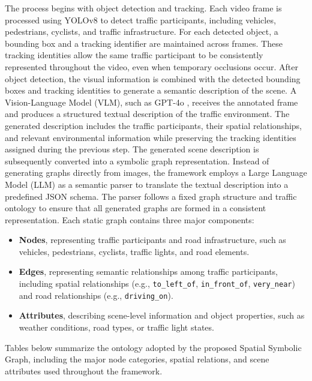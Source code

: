 \documentclass[a4paper, 11pt]{article} %
\begin{document}
The process begins with object detection and tracking. Each video frame is processed using YOLOv8 \cite{redmon2016you} to detect traffic participants, including vehicles, pedestrians, cyclists, and traffic infrastructure. For each detected object, a bounding box and a tracking identifier are maintained across frames. These tracking identities allow the same traffic participant to be consistently represented throughout the video, even when temporary occlusions occur.
After object detection, the visual information is combined with the detected bounding boxes and tracking identities to generate a semantic description of the scene. A Vision-Language Model (VLM), such as GPT-4o \cite{achiam2023gpt4}, receives the annotated frame and produces a structured textual description of the traffic environment. The generated description includes the traffic participants, their spatial relationships, and relevant environmental information while preserving the tracking identities assigned during the previous step.
The generated scene description is subsequently converted into a symbolic graph representation. Instead of generating graphs directly from images, the framework employs a Large Language Model (LLM) as a semantic parser to translate the textual description into a predefined JSON schema. The parser follows a fixed graph structure and traffic ontology to ensure that all generated graphs are formed in a consistent representation.
Each static graph contains three major components:

\begin{itemize}
    \item \textbf{Nodes}, representing traffic participants and road infrastructure, such as vehicles, pedestrians, cyclists, traffic lights, and road elements.
    \item \textbf{Edges}, representing semantic relationships among traffic participants, including spatial relationships (e.g., \texttt{to\_left\_of}, \texttt{in\_front\_of}, \texttt{very\_near}) and road relationships (e.g., \texttt{driving\_on}).
    \item \textbf{Attributes}, describing scene-level information and object properties, such as weather conditions, road types, or traffic light states.
\end{itemize}
Tables below summarize the ontology adopted by the proposed Spatial Symbolic Graph, including the major node categories, spatial relations, and scene attributes used throughout the framework.
\end{document}
